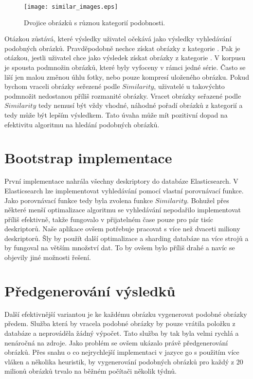 \begin{figure}[h]
  \centering
  \texttt{[image: similar\_images.eps]}
  \caption{Dvojice obrázků s různou kategorií podobnosti.}
  \label{fig:simexamples}
\end{figure}

Otázkou zůstává, které výsledky uživatel očekává jako výsledky vyhledávání podobných obrázků. Pravděpodobně nechce získat obrázky z kategorie . Pak je otázkou, jestli uživatel chce jako výsledek získat obrázky z kategorie . V korpusu je spousta podmnožin obrázků, které byly vyfoceny v rámci jedné série. Často se liší jen malou změnou úhlu fotky, nebo pouze kompresí uloženého obrázku. Pokud bychom vraceli obrázky seřezené podle $Similarity$, uživatelé u takovýchto podmnožit nedostanou příliš rozmanité obrázky. Vracet obrázky seřazené podle $Similarity$ tedy nemusí být vždy vhodné, náhodné pořadí obrázků z kategorií  a  tedy může být lepším výsledkem. Tato úvaha může mít pozitivní dopad na efektivitu algoritmu na hledání podobných obrázků.


\section{Bootstrap implementace}

První implementace nahrála všechny deskriptory do databáze Elasticsearch. V Elasticsearch lze implementovat vyhledávání pomocí vlastní porovnávací funkce. Jako porovnávací funkce tedy byla zvolena funkce $Similarity$. Bohužel přes některé menší optimalizace algoritmu se vyhledávání nepodařilo implementovat příliš efektivně, takže fungovalo v přijatelném čase pouze pro pár tisíc deskriptorů. Naše aplikace ovšem potřebuje pracovat s více než dvaceti miliony deskriptorů. Šly by použít další optimalizace a sharding databáze na více strojů a by fungoval na větším množství dat. To by ovšem bylo příliš drahé a navíc se objevily jiné možnosti řešení.


\section{Předgenerování výsledků}

Další efektivnější variantou je ke každému obrázku vygenerovat podobné obrázky předem. Služba která by vracela podobné obrázky by pouze vrátila položku z databáze a neprováděla žádný výpočet. Tato služba by tak byla velmi rychlá a nenáročná na zdroje. Jako problém se ovšem ukázalo právě předgenerování obrázků. Přes snahu o co nejrychlejší implementaci v jazyce go s použitím více vláken a několika heuristik, by vygenerování podobných obrázků pro každý z 20 milionů obrázků trvalo na běžném počítači několik týdnů.


